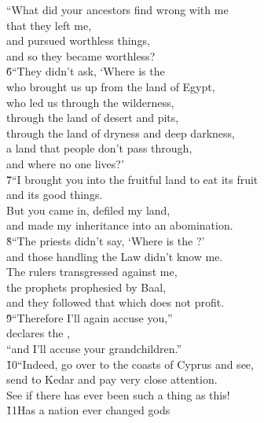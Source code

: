 \begin{poetry}
\poeml ``What did your ancestors find wrong with me \\
\poemll    that they left me, \\
\poeml and pursued worthless things, \\
\poemll    and so they became worthless? \\
\poeml \v{6}``They didn't ask, `Where is the  \\
\poemll    who brought us up from the land of Egypt, \\
\poeml who led us through the wilderness, \\
\poemll    through the land of desert and pits, \\
\poeml through the land of dryness and deep darkness, \\
\poemll    a land that people don't pass through, \\
\poemlll       and where no one lives?' \\
\poeml \v{7}``I brought you into the fruitful land to eat its fruit \\
\poemll    and its good things. \\
\poeml But you came in, defiled my land, \\
\poemll    and made my inheritance into an abomination. \\
\poeml \v{8}``The priests didn't say, `Where is the ?' \\
\poemll    and those handling the Law didn't know me. \\
\poeml The rulers transgressed against me, \\
\poemll    the prophets prophesied by Baal, \\
\poemlll       and they followed that which does not profit. \\
\poeml \v{9}``Therefore I'll again accuse you,'' \\
\poemll    declares the , \\
\poeml ``and I'll accuse your grandchildren.'' \\
\poeml \v{10}``Indeed, go over to the coasts of Cyprus and see, \\
\poemll    send to Kedar and pay very close attention. \\
\poemlll       See if there has ever been such a thing as this! \\
\poeml \v{11}Has a nation ever changed gods \\

\end{poetry}
